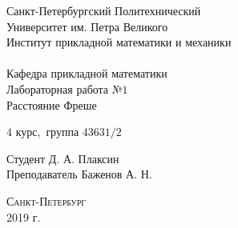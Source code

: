 \documentclass[a4]{article}
\begin{document}
\def\contentsname{\LARGE{Содержание}}
\thispagestyle{empty}
\begin{center} 
\vspace{2cm} 
{\Large \sc Санкт-Петербургский Политехнический}\\
\vspace{2mm}
{\Large \sc Университет} им. {\Large\sc Петра Великого}\\
\vspace{1cm}
{\large \sc Институт прикладной математики и механики\\ 
\vspace{0.5mm}
\textsc{}}\\ 
\vspace{0.5mm}
{\large\sc Кафедра прикладной математики}\\
\vspace{15mm}
{\huge \sc Лабораторная работа №$1$\\
\vspace{4mm}
Расстояние Фреше
\vspace{6mm}
 }
\vspace*{2mm}
\vspace{1cm}

{\sc $4$ курс$,$ группа $43631/2$}

\vspace{2cm} 
Студент \hfill Д. А. Плаксин\\
\vspace{1cm}
Преподаватель \hfill Баженов А. Н.\\
\vspace{20mm} 

\end{center} 
\begin{center}
\vfill {\large\textsc{Санкт-Петербург}}\\ 
2019 г.
\end{center}

\end{document}
